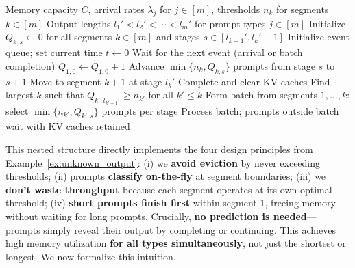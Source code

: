 \begin{algorithm}[h]
\caption{Nested WAIT: Nested Waiting for Accumulated Inference Threshold}
\label{alg:nested_wait}
{\small\linespread{1.0}\selectfont
\begin{algorithmic}[1]
\Require Memory capacity \( C \), arrival rates \( \lambda_j \) for \( j \in [m] \), thresholds \( n_k \) for segments \( k \in [m] \)
\Require Output lengths \( l_1' < l_2' < \cdots < l_m' \) for prompt types \( j \in [m] \)
\Statex {}
\State Initialize \( Q_{k,s} \gets 0 \) for all segments \( k \in [m] \) and stages \( s \in [l_{k-1}', l_k'-1] \)
\State Initialize event queue; set current time \( t \gets 0 \)
    \State Wait for the next event (arrival or batch completion)
        \State \( Q_{1,0} \gets Q_{1,0} + 1 \)  
            \State Advance \( \min\{n_k, Q_{k,s}\} \) prompts from stage \( s \) to \( s+1 \)
        \EndFor
                \State Move to segment \( k+1 \) at stage \( l_k' \) 
            \Else
                \State Complete and clear KV caches
            \EndIf
        \EndIf
    \EndIf
    \State Find largest \( k \) such that \( Q_{k', l_{k'-1}'} \geq n_{k'} \) for all \( k' \leq k \) 
        \State Form batch from segments \( 1, \dots, k \): select \( \min\{n_{k'}, Q_{k',s}\} \) prompts per stage
        \State Process batch; prompts outside batch wait with KV caches retained
    \EndIf
\EndWhile
\end{algorithmic}
}
\end{algorithm}

This nested structure directly implements the four design principles from Example~\ref{ex:unknown_output}: (i) we \textbf{avoid eviction} by never exceeding thresholds; (ii) prompts \textbf{classify on-the-fly} at segment boundaries; (iii) we \textbf{don't waste throughput} because each segment operates at its own optimal threshold; (iv) \textbf{short prompts finish first} within segment 1, freeing memory without waiting for long prompts. Crucially, \textbf{no prediction is needed}—prompts simply reveal their output by completing or continuing. This achieves high memory utilization \textbf{for all types simultaneously}, not just the shortest or longest. We now formalize this intuition.


